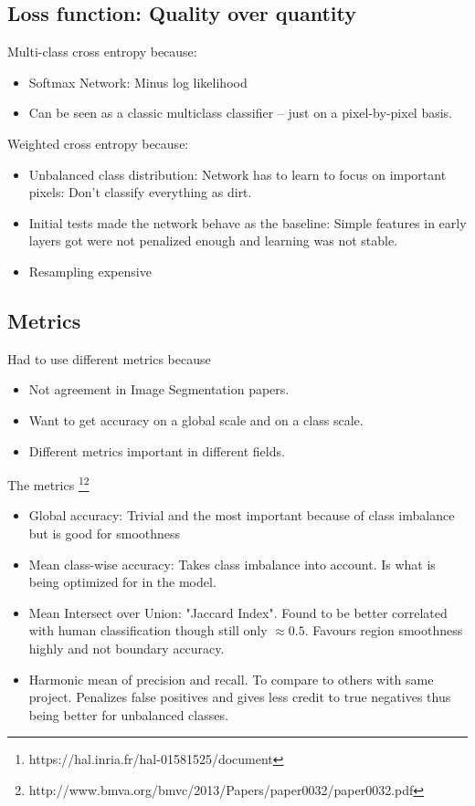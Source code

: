 \documentclass[12pt,fleqn]{article}
\begin{document}
\subsection{Loss function: Quality over quantity}
Multi-class cross entropy because:
\begin{itemize}
	\item Softmax Network: Minus log likelihood
	\item Can be seen as a classic multiclass classifier -- just on a pixel-by-pixel basis.
\end{itemize}
Weighted cross entropy because:
\begin{itemize}
	\item Unbalanced class distribution: Network has to learn to focus on important pixels: Don't classify everything as dirt.
	\item Initial tests made the network behave as the baseline: Simple features in early layers got were not penalized enough and learning was not stable.
	\item Resampling expensive
\end{itemize}
\subsection{Metrics}
Had to use different metrics because
\begin{itemize}
	\item Not agreement in Image Segmentation papers.
	\item Want to get accuracy on a global scale and on a class scale.
	\item Different metrics important in different fields.
\end{itemize}
The metrics \footnote{https://hal.inria.fr/hal-01581525/document}\footnote{
http://www.bmva.org/bmvc/2013/Papers/paper0032/paper0032.pdf} 
\begin{itemize}
	\item Global accuracy: Trivial and  the most important because of class imbalance but is good for smoothness
	\item Mean class-wise accuracy: Takes class imbalance into account. Is what is being optimized for in the model.
	\item Mean Intersect over Union: "Jaccard Index".  Found to be better correlated with human classification though still only \(\approx 0.5\). Favours region smoothness highly and not boundary accuracy.
	\item Harmonic mean of precision and recall. To compare to others with same project. Penalizes false positives and gives less credit to true negatives thus being better for unbalanced classes.
\end{itemize}
\end{document}
